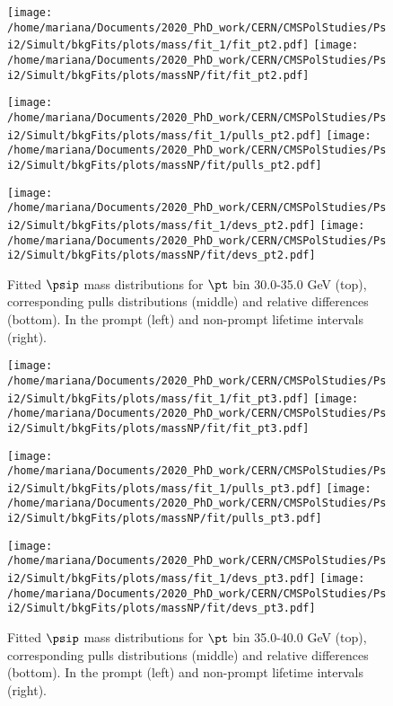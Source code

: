 \pagebreak

\begin{figure}[h!]
\centering
\texttt{[image: /home/mariana/Documents/2020\_PhD\_work/CERN/CMSPolStudies/Psi2/Simult/bkgFits/plots/mass/fit\_1/fit\_pt2.pdf]}
\texttt{[image: /home/mariana/Documents/2020\_PhD\_work/CERN/CMSPolStudies/Psi2/Simult/bkgFits/plots/massNP/fit/fit\_pt2.pdf]}

\texttt{[image: /home/mariana/Documents/2020\_PhD\_work/CERN/CMSPolStudies/Psi2/Simult/bkgFits/plots/mass/fit\_1/pulls\_pt2.pdf]}
\texttt{[image: /home/mariana/Documents/2020\_PhD\_work/CERN/CMSPolStudies/Psi2/Simult/bkgFits/plots/massNP/fit/pulls\_pt2.pdf]}

\texttt{[image: /home/mariana/Documents/2020\_PhD\_work/CERN/CMSPolStudies/Psi2/Simult/bkgFits/plots/mass/fit\_1/devs\_pt2.pdf]}
\texttt{[image: /home/mariana/Documents/2020\_PhD\_work/CERN/CMSPolStudies/Psi2/Simult/bkgFits/plots/massNP/fit/devs\_pt2.pdf]}
\caption{Fitted $\psip$ mass distributions for $\pt$ bin 30.0-35.0 GeV (top), corresponding pulls distributions (middle) and relative differences (bottom). In the prompt (left) and non-prompt lifetime intervals (right).}\label{f:m_fit_2}
\end{figure}

\pagebreak

\begin{figure}[h!]
\centering
\texttt{[image: /home/mariana/Documents/2020\_PhD\_work/CERN/CMSPolStudies/Psi2/Simult/bkgFits/plots/mass/fit\_1/fit\_pt3.pdf]}
\texttt{[image: /home/mariana/Documents/2020\_PhD\_work/CERN/CMSPolStudies/Psi2/Simult/bkgFits/plots/massNP/fit/fit\_pt3.pdf]}

\texttt{[image: /home/mariana/Documents/2020\_PhD\_work/CERN/CMSPolStudies/Psi2/Simult/bkgFits/plots/mass/fit\_1/pulls\_pt3.pdf]}
\texttt{[image: /home/mariana/Documents/2020\_PhD\_work/CERN/CMSPolStudies/Psi2/Simult/bkgFits/plots/massNP/fit/pulls\_pt3.pdf]}

\texttt{[image: /home/mariana/Documents/2020\_PhD\_work/CERN/CMSPolStudies/Psi2/Simult/bkgFits/plots/mass/fit\_1/devs\_pt3.pdf]}
\texttt{[image: /home/mariana/Documents/2020\_PhD\_work/CERN/CMSPolStudies/Psi2/Simult/bkgFits/plots/massNP/fit/devs\_pt3.pdf]}
\caption{Fitted $\psip$ mass distributions for $\pt$ bin 35.0-40.0 GeV (top), corresponding pulls distributions (middle) and relative differences (bottom). In the prompt (left) and non-prompt lifetime intervals (right).}\label{f:m_fit_3}
\end{figure}

